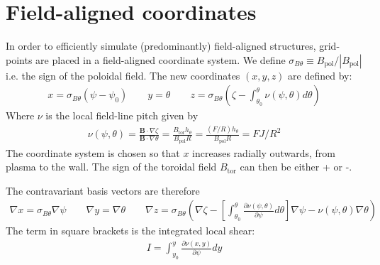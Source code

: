 \documentclass[12pt]{article}
\newcommand{\sbt}{\ensuremath{\sigma_{B\theta}}}
\newcommand{\deriv}[2]{\ensuremath{\frac{\partial #1}{\partial #2}}}
\newcommand{\hthe}{\ensuremath{h_\theta}}
\newcommand{\Bp}{\ensuremath{B_{\text{pol}}}}
\newcommand{\Bt}{\ensuremath{B_{\text{tor}}}}
\newcommand{\ve}[1]{\ensuremath{\boldsymbol{#1}}}
\newcommand{\Bvec}{\ve{B}}
\begin{document}
\section{Field-aligned coordinates}
In order to efficiently simulate (predominantly) field-aligned structures,
grid-points
are placed in a field-aligned coordinate system. We define $\sigma_{B\theta}
\equiv \Bp / \left|\Bp\right|$
i.e. the sign of the poloidal field. The new coordinates $\left(x,y,z\right)$
are defined by:
%
\begin{align}
x = \sbt\left(\psi - \psi_0\right) \qquad
y = \theta \qquad
z = \sigma_{B\theta}
    \left(\zeta - 
          \int_{\theta_0}^{\theta}\nu\left(\psi,\theta\right)d\theta\right)
\label{eq:coordtransform}
\end{align}
%
Where $\nu$ is the local field-line pitch given by
%
\begin{align*}
\nu\left(\psi, \theta\right) =
\frac{\Bvec\cdot\nabla\zeta}{\Bvec\cdot\nabla\theta} =
\frac{\Bt\hthe}{\Bp R} = \frac{\left(F/R\right)h_\theta}{\Bp R} = FJ/R^2
\end{align*}
%
The coordinate system is chosen so that $x$ increases radially outwards, from
plasma to the wall.
The sign of the toroidal field $\Bt$ can then be either + or -.

The contravariant basis vectors are therefore
%
\begin{align*}
\nabla x = \sbt\nabla \psi \qquad \nabla y = \nabla \theta \qquad \nabla z =
\sbt\left(\nabla\zeta - \left[\int_{\theta_0}^\theta\deriv{\nu\left(\psi,
\theta\right)}{\psi} d\theta\right] \nabla\psi - \nu\left(\psi,
\theta\right)\nabla\theta\right)
\end{align*}
%
The term in square brackets is the integrated local shear:
%
\begin{align*}
I = \int_{y_0}^y\frac{\partial\nu\left(x, y\right)}{\partial\psi}dy
\end{align*}
%
\end{document}
